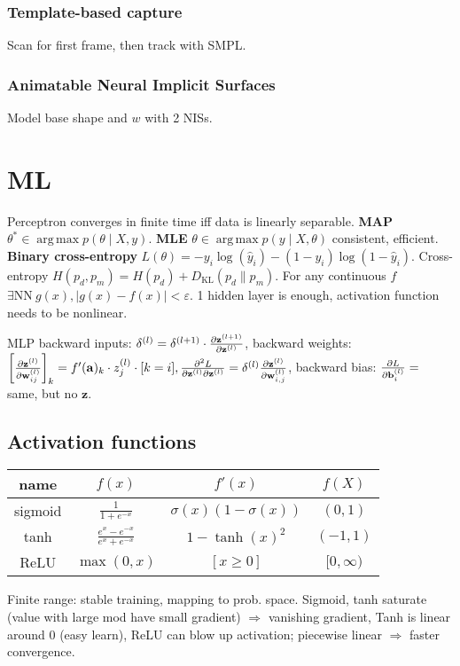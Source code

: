 \documentclass[11pt,landscape,a4paper,fleqn]{article}
\newcommand{\kl}[2]{D_{\mathrm{KL}}(#1\lVert#2)}
\DeclareMathOperator*{\argmax}{arg\,max}
\def\myvector#1{\mathbf{#1}}
\def\va{{\myvector{a}}}
\def\vb{{\myvector{b}}}
\def\vw{{\myvector{w}}}
\def\vz{{\myvector{z}}}
\begin{document}
\begin{multicols*}{4}
\subsubsection{Template-based capture}
Scan for first frame, then track with SMPL.

\subsubsection{Animatable Neural Implicit Surfaces}

Model base shape and $w$ with 2 NISs.

\section{ML}

Perceptron converges in finite time iff data is linearly separable.
\textbf{MAP} $\theta^* \in \argmax p(\theta \mid X, y)$.
\textbf{MLE} $\theta \in \argmax p(y \mid X, \theta)$ consistent, efficient.
\textbf{Binary cross-entropy} $L(\theta) = - y_i \log(\hat{y}_i) - (1 - y_i) \log(1 - \hat{y}_i)$.
Cross-entropy $H(p_d, p_m) = H(p_d) + \kl{p_d}{p_m}$.
For any continuous $f$ $\exists \mathrm{NN}\ g(x), |g(x) - f(x)| < \varepsilon$.
1 hidden layer is enough, activation function needs to be nonlinear.

MLP backward inputs: $\delta^{(l)} = \delta^{(l + 1)} \cdot \pdv{\vz^{(l + 1)}}{\vz^{(l)}}$,
backward weights: $\left[\pdv{\vz^{(l)}}{\vw_{ij}^{(l)}}\right]_k = f'(\va)_k \cdot z_j^{(l)} \cdot [k = i],
\pdv{L}{\vz^{(l)}}{\vz^{(l)}} = \delta^{(l)} \pdv{\vz^{(l)}}{\vw_{i,j}^{(l)}}$,
backward bias: $\pdv{L}{\vb_i^{(l)}} =$ same, but no $\vz$.

\subsection{Activation functions} \phantom{a}

\begin{tabular}[]{@{}c@{}ccc@{}}
    \toprule
    name & $f(x)$ & $f'(x)$ & $f(X)$ \\
    \midrule
    sigmoid & $\frac{1}{1 + e^{-x}}$ & $\sigma(x)(1 - \sigma(x))$ & $(0, 1)$ \\
    tanh & $\frac{e^x - e^{-x}}{e^x + e^{-x}}$ & $1 - \tanh(x)^2$ & $( - 1, 1)$ \\
    ReLU & $\max(0, x)$ & $[x \geq 0]$ & $[0, \infty)$ \\
\end{tabular}
Finite range: stable training, mapping to prob. space.
Sigmoid, tanh saturate (value with large mod have small gradient) $ \Rightarrow $ vanishing gradient,
Tanh is linear around 0 (easy learn),
ReLU can blow up activation; piecewise linear $ \Rightarrow $ faster convergence.


\end{multicols*}
\end{document}

